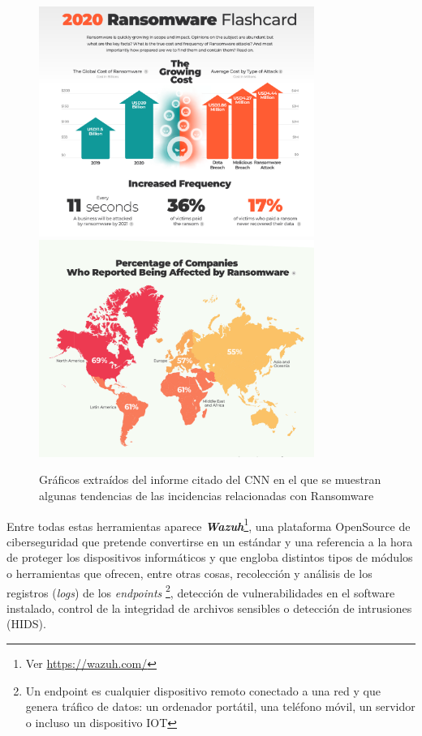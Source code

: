 \begin{figure}[hbtp]
  \centering
  \includegraphics[width=0.8\textwidth]{imagenes/ransomware1.png}
  \includegraphics[width=0.8\textwidth]{imagenes/ransomware2.png}  
  \caption{Gráficos extraídos del informe citado del CNN en el que se muestran algunas tendencias de las incidencias relacionadas con \gls{Ransomware} \cite{cnncert}}
\end{figure}


Entre todas estas herramientas aparece \textbf{\textit{Wazuh}}\footnote{Ver \url{https://wazuh.com/}\cite{WAZUH}}, una plataforma \gls{OpenSource} de ciberseguridad que pretende convertirse en un estándar y una referencia a la hora de proteger los dispositivos informáticos y que engloba distintos tipos de módulos o herramientas que ofrecen, entre otras cosas, recolección y análisis de los registros (\textit{logs}) de los \textit{endpoints} \footnote{Un endpoint es cualquier dispositivo remoto conectado a una red y que genera tráfico de datos: un ordenador portátil, una teléfono móvil, un servidor o incluso un dispositivo IOT}, detección de vulnerabilidades en el software instalado, control de la integridad de archivos sensibles o detección de intrusiones (HIDS).


